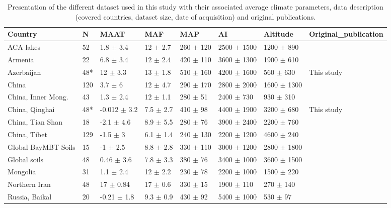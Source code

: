 \begin{table}[ht]
\centering
\caption{Presentation of the different dataset used in this study with their associated average climate parameters, data description (covered countries, dataset size, date of acquisition) and original publications.} 
\label{Table_ACA}
\begin{tabular}{llllllll}
  \toprule
Country & N & MAAT & MAF & MAP & AI & Altitude & Original_publication \\ 
  \midrule
ACA lakes & 52 & 1.8 $\pm$ 3.4 & 12 $\pm$ 2.7 & 260 $\pm$ 120 & 2500 $\pm$ 1500 & 1200 $\pm$ 890 & \citet{Wang_2021} \\ 
  Armenia & 22 & 6.8 $\pm$ 3.4 & 12 $\pm$ 2.4 & 420 $\pm$ 110 & 3600 $\pm$ 1300 & 1900 $\pm$ 610 & \citet{Cromartie_in review} \\ 
  Azerbaijan & 48* & 12 $\pm$ 3.3 & 13 $\pm$ 1.8 & 510 $\pm$ 160 & 4200 $\pm$ 1600 & 560 $\pm$ 630 & This study \\ 
  China & 120 & 3.7 $\pm$ 6 & 12 $\pm$ 4.7 & 290 $\pm$ 170 & 2800 $\pm$ 2000 & 1600 $\pm$ 1300 & \citet{Wang_2020,  Wang et Liu (2021,  Zang_2018,  Dang_2018} \\ 
  China, Inner Mong. & 43 & 1.3 $\pm$ 2.4 & 12 $\pm$ 1.1 & 280 $\pm$ 51 & 2400 $\pm$ 730 & 930 $\pm$ 310 & \citet{Guo_2021,  Li_2017} \\ 
  China, Qinghai & 48* & -0.012 $\pm$ 3.2 & 7.5 $\pm$ 2.7 & 410 $\pm$ 98 & 4400 $\pm$ 1900 & 3200 $\pm$ 680 & This study \\ 
  China, Tian Shan & 18 & -2.1 $\pm$ 4.6 & 8.9 $\pm$ 5.5 & 280 $\pm$ 76 & 3900 $\pm$ 2400 & 2200 $\pm$ 760 & \citet{Duan_2020} \\ 
  China, Tibet & 129 & -1.5 $\pm$ 3 & 6.1 $\pm$ 1.4 & 240 $\pm$ 130 & 2200 $\pm$ 1200 & 4600 $\pm$ 240 & \citet{Kou_2022} \\ 
  Global BayMBT Soils & 15 & -1 $\pm$ 2.5 & 8.8 $\pm$ 2.8 & 330 $\pm$ 110 & 3000 $\pm$ 1200 & 2800 $\pm$ 1800 & \citet{Dearing Crampton_Flood_2020} \\ 
  Global soils & 48 & 0.46 $\pm$ 3.6 & 7.8 $\pm$ 3.3 & 380 $\pm$ 76 & 3400 $\pm$ 1000 & 3600 $\pm$ 1500 & \citet{Naafs_2017a} \\ 
  Mongolia & 31 & 1.1 $\pm$ 2.4 & 12 $\pm$ 2.2 & 230 $\pm$ 78 & 2200 $\pm$ 1000 & 1500 $\pm$ 220 & \citet{Dugerdil_2021} \\ 
  Northern Iran & 48 & 17 $\pm$ 0.84 & 17 $\pm$ 0.6 & 330 $\pm$ 15 & 1900 $\pm$ 110 & 270 $\pm$ 140 & \citet{Duan_2021} \\ 
  Russia, Baikal & 20 & -0.21 $\pm$ 1.8 & 9.3 $\pm$ 0.9 & 430 $\pm$ 92 & 5400 $\pm$ 1000 & 530 $\pm$ 97 & \citet{Dugerdil_2021,  De Jonge_2015a, Khodzher_2017} \\ 

\end{tabular}
\end{table}
